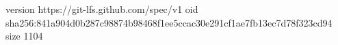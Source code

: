 version https://git-lfs.github.com/spec/v1
oid sha256:841a904d0b287c98874b98468f1ee5ccac30e291cf1ae7fb13ec7d78f323cd94
size 1104
